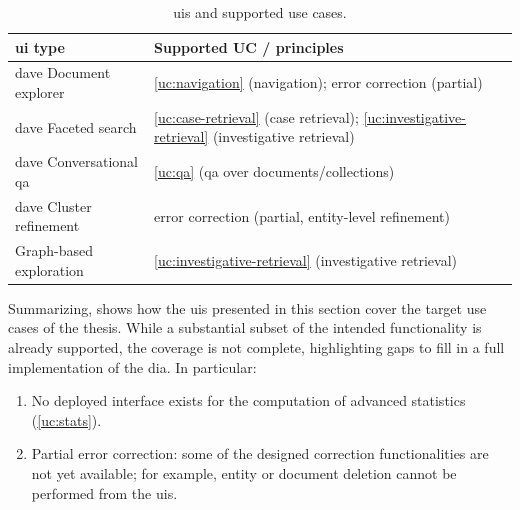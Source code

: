 \begin{table}[htbp]
\centering
\caption{\Aclp{ui} and supported use cases.}
\label{tab:uc:ui}
\begin{tabularx}{\textwidth}{p{6cm} X}
\toprule
\textbf{\ac{ui} type} & \textbf{Supported UC / principles} \\
\midrule

\ac{dave} Document explorer &
\ref{uc:navigation} (navigation); error correction (partial) \\

\ac{dave} Faceted search &
\ref{uc:case-retrieval} (case retrieval);
\ref{uc:investigative-retrieval} (investigative retrieval) \\

\ac{dave} Conversational \ac{qa} &
\ref{uc:qa} (\ac{qa} over documents/collections) \\

\ac{dave} Cluster refinement &
error correction (partial, entity-level refinement)  \\

Graph-based exploration &
\ref{uc:investigative-retrieval} (investigative retrieval) \\

\bottomrule
\end{tabularx}
\end{table}

\medskip
\noindent
Summarizing,  shows how the \acp{ui} presented in this section cover the target use cases of the thesis.
While a substantial subset of the intended functionality is already supported, the coverage is not complete, highlighting gaps to fill in a full implementation of the \ac{dia}. In particular:

\begin{enumerate}
    \item No deployed interface exists for the computation of advanced statistics (\ref{uc:stats}).
    \item Partial error correction: some of the designed correction functionalities are not yet available; for example, entity or document deletion cannot be performed from the \acp{ui}.
\end{enumerate}




